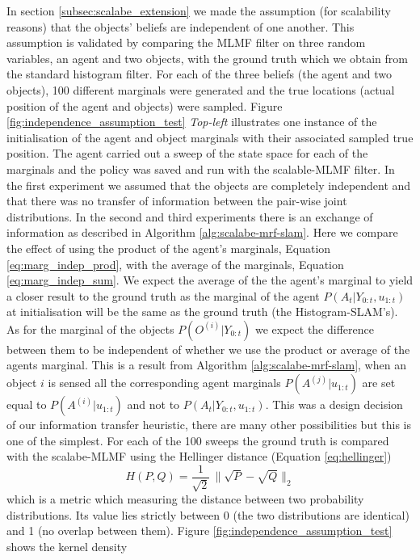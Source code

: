 In section \ref{subsec:scalabe_extension} we made the assumption (for scalability reasons) that the objects' beliefs are independent
of one another. This assumption is validated by comparing the MLMF filter on three random variables, an agent and two objects, with the ground truth
which we obtain from the standard histogram filter. For each of the three beliefs (the agent and two objects), 100 different marginals 
were generated and the true locations (actual position of the agent and objects) were sampled. 
Figure \ref{fig:independence_assumption_test} \textit{Top-left} illustrates one instance of the initialisation of the agent and object marginals
with their associated sampled true position.
The agent carried out  a sweep of the state space for each of the marginals and the policy was saved 
and run with the scalable-MLMF filter. In the first experiment we assumed that the objects are completely independent 
and that there was no transfer of information between the pair-wise joint distributions. In the second and third experiments there 
is an exchange of information as described in Algorithm \ref{alg:scalabe-mrf-slam}. Here we compare the effect of using 
the product of the agent's marginals, Equation \ref{eq:marg_indep_prod}, with the average of the marginals, Equation \ref{eq:marg_indep_sum}.
We expect the average of the the agent's marginal to yield a closer result to the ground truth as the marginal of the 
agent $P(A_t|Y_{0:t},u_{1:t})$ at initialisation will be the same as the ground truth (the Histogram-SLAM's). As for the marginal of the 
objects $P(O^{(i)}|Y_{0:t})$ we expect the difference between them to be independent of whether we use the product or average of the 
agents marginal. This is a result from Algorithm \ref{alg:scalabe-mrf-slam}, when an object $i$ is sensed all the corresponding 
agent marginals $P(A^{(j)}|u_{1:t})$ are set equal to $P(A^{(i)}|u_{1:t})$ and not to $P(A_t|Y_{0:t},u_{1:t})$. This was a design 
decision of our information transfer heuristic, there are many other possibilities but this is one of the simplest.
For each of the 100 sweeps the ground truth is compared with the scalabe-MLMF using the Hellinger distance (Equation \ref{eq:hellinger})
\begin{equation} \label{eq:hellinger}
 H(P,Q) = \frac{1}{\sqrt{2}}\, \|\sqrt{P} - \sqrt{Q}\|_2  
\end{equation}
which is a metric which measuring the distance between two probability distributions. Its value lies strictly between 0 (the two 
distributions are identical) and 1 (no overlap between them). Figure \ref{fig:independence_assumption_test} shows the kernel density 
